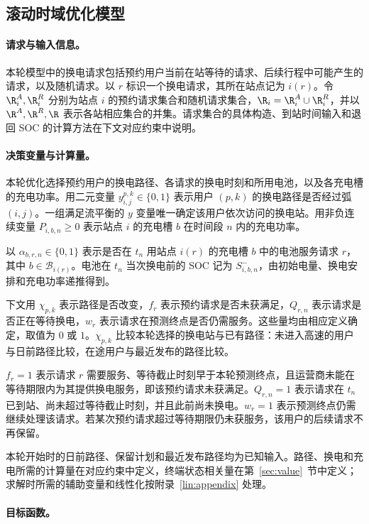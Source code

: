 \subsection{滚动时域优化模型}
\label{sec:model}

\paragraph{请求与输入信息。}
本轮模型中的换电请求包括预约用户当前在站等待的请求、后续行程中可能产生的请求，以及随机请求。以 $r$ 标识一个换电请求，其所在站点记为 $i(r)$。令 $\R_i^A,\R_i^R$ 分别为站点 $i$ 的预约请求集合和随机请求集合，$\R_i=\R_i^A\cup\R_i^R$，并以 $\R^A,\R^R,\R$ 表示各站相应集合的并集。请求集合的具体构造、到站时间输入和退回 SOC 的计算方法在下文对应约束中说明。

\paragraph{决策变量与计算量。}
本轮优化选择预约用户的换电路径、各请求的换电时刻和所用电池，以及各充电槽的充电功率。用二元变量 $y_{i,j}^{p,k}\in\{0,1\}$ 表示用户 $(p,k)$ 的换电路径是否经过弧 $(i,j)$。一组满足流平衡的 $y$ 变量唯一确定该用户依次访问的换电站。用非负连续变量 $P_{i,b,n}\ge0$ 表示站点 $i$ 的充电槽 $b$ 在时间段 $n$ 内的充电功率。

以 $\alpha_{b,r,n}\in\{0,1\}$ 表示是否在 $t_n$ 用站点 $i(r)$ 的充电槽 $b$ 中的电池服务请求 $r$，其中 $b\in\mathcal B_{i(r)}$。电池在 $t_n$ 当次换电前的 SOC 记为 $S_{i,b,n}^{-}$，由初始电量、换电安排和充电功率递推得到。

下文用 $\chi_{p,k}$ 表示路径是否改变，$f_r$ 表示预约请求是否未获满足，$Q_{r,n}$ 表示请求是否正在等待换电，$w_r$ 表示请求在预测终点是否仍需服务。这些量均由相应定义确定，取值为 $0$ 或 $1$。$\chi_{p,k}$ 比较本轮选择的换电站与已有路径：未进入高速的用户与日前路径比较，在途用户与最近发布的路径比较。

$f_r=1$ 表示请求 $r$ 需要服务、等待截止时刻早于本轮预测终点，且运营商未能在等待期限内为其提供换电服务，即该预约请求未获满足。$Q_{r,n}=1$ 表示请求在 $t_n$ 已到站、尚未超过等待截止时刻，并且此前尚未换电。$w_r=1$ 表示预测终点仍需继续处理该请求。若某次预约请求超过等待期限仍未获服务，该用户的后续请求不再保留。

本轮开始时的日前路径、保留计划和最近发布路径均为已知输入。路径、换电和充电所需的计算量在对应约束中定义，终端状态相关量在第~\ref{sec:value}~节中定义；求解时所需的辅助变量和线性化按附录~\ref{lin:appendix} 处理。

\paragraph{目标函数。}

